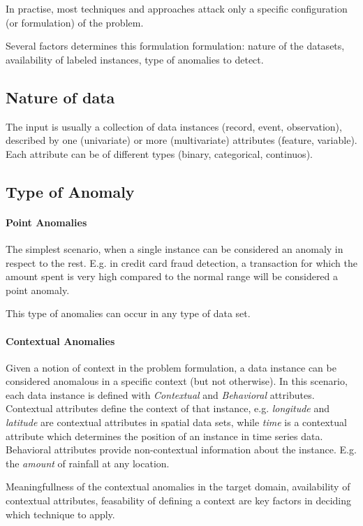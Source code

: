In practise, most techniques and approaches attack only a specific configuration (or formulation) of the problem.

Several factors determines this formulation formulation: nature of the datasets, availability of labeled instances, type of anomalies to detect.

\subsection{Nature of data}

The input is usually a collection of data instances (record, event, observation), described by one (univariate) or more (multivariate) attributes (feature, variable). Each attribute can be of different types (binary, categorical, continuos).


\subsection{Type of Anomaly}

\paragraph{Point Anomalies} The simplest scenario, when a single instance can be considered an anomaly in respect to the rest. E.g. in credit card fraud detection, a transaction for which the amount spent is very high compared to the normal range will be considered a point anomaly.

This type of anomalies can occur in any type of data set.

\paragraph{Contextual Anomalies} Given a notion of context in the problem formulation, a data instance can be considered anomalous in a specific context (but not otherwise). In this scenario, each data instance is defined with \textit{Contextual} and \textit{Behavioral} attributes. Contextual attributes define the context of that instance, e.g. \textit{longitude} and \textit{latitude} are contextual attributes in spatial data sets, while \textit{time} is a contextual attribute which determines the position of an instance in time series data. Behavioral attributes provide non-contextual information about the instance. E.g. the \textit{amount} of rainfall at any location.

Meaningfullness of the contextual anomalies in the target domain, availability of contextual attributes, feasability of defining a context are key factors in deciding which technique to apply.

